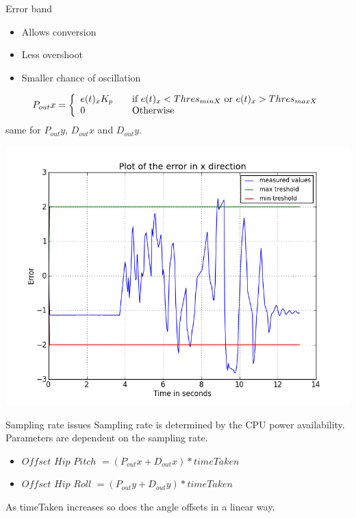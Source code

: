 \documentclass{beamer}
\begin{document}
\begin{frame}{Error band}
\begin{itemize} 
   \item Allows conversion
   \item Less overshoot
   \item Smaller chance of oscillation
\end{itemize}
\vspace{10 mm}
\[
  P_{out}x = \left\{ 
  \begin{array}{l l}
     e(t)_xK_p& \quad \text{if $e(t)_x < Thres_{min X}$ or $e(t)_x > Thres_{max X}$}\\ 
     0& \quad \text{Otherwise}\\
  \end{array} \right.
\]
\vspace{2 mm}
same for $P_{out}y$, $D_{out}x$ and $D_{out}y$.
\end{frame}

\begin{frame}
\centering
 \includegraphics[scale=0.5]{pics/back_balanceon_X.png}
\end{frame}

\begin{frame}{Sampling rate issues}
Sampling rate is determined by the CPU power availability.
Parameters are dependent on the sampling rate. 
\vspace{5 mm}
\begin{itemize}
	\item $Offset$ $Hip$ $Pitch$ $= (P_{out}x + D_{out}x) * timeTaken $ 
	\item $Offset$ $Hip$ $Roll$ $=  (P_{out}y + D_{out}y) * timeTaken$ 
\end{itemize}
\vspace{5 mm}
As timeTaken increases so does the angle offsets in a linear way.
\end{frame}
\end{document}
